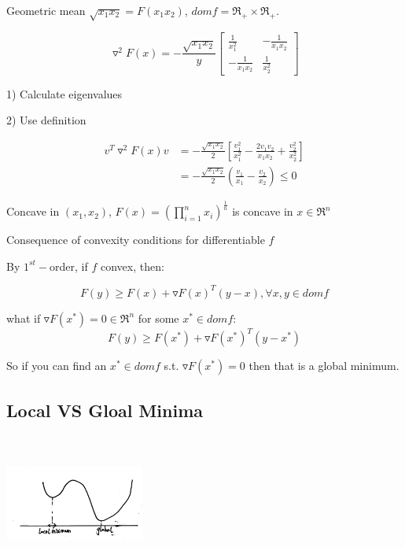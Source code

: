 \begin{example}
	Geometric mean $\sqrt{x_1x_2} = F(x_1x_2)$, $domf = \Re_+ \times \Re_+$.
	
	\begin{equation*}
	\triangledown^2F(x) = -\frac{\sqrt{x_1x_2}}{y}\begin{bmatrix}
	\frac{1}{x^2_1} & -\frac{1}{x_1x_2}\\
	-\frac{1}{x_1x_2} & \frac{1}{x^2_2}
	\end{bmatrix}
	\end{equation*}
	
	1) Calculate eigenvalues
	
	2) Use definition
	
	\begin{align*}
	v^T\triangledown^2F(x)v &= -\frac{\sqrt{x_1x_2}}{2}[\frac{v_1^2}{x_1^2} - \frac{2v_1v_2}{x_1x_2} + \frac{v_2^2}{x^2_2}]\\
	&= -\frac{\sqrt{x_1x_2}}{2}(\frac{v_1}{x_1} -\frac{v_2}{x_2}) \leq 0
	\end{align*}
	
	Concave in $(x_1, x_2)$, $F(x) = (\prod^n_{i=1}x_i)^{\frac{1}{n}}$ is concave in $x\in \Re^n$
\end{example}

Consequence of convexity conditions for differentiable $f$

By $1^{st}-$order, if $f$ convex, then:

\begin{equation*}
F(y)\geq F(x) + \triangledown F(x)^T(y-x), \forall x,y\in domf
\end{equation*}


what if $\triangledown F(x^*) = 0 \in \Re^n$ for some $x^*\in domf$:
\begin{equation*}
F(y)\geq F(x^*) + \triangledown F(x^*)^T(y-x^*)
\end{equation*}

So if you can find an $x^*\in domf$ s.t. $\triangledown F(x^*) = 0$ then that is a global minimum.





\subsection{Local VS Gloal Minima}

\begin{marginfigure}
	\centering
	\includegraphics[width=1.8in,height=1.8in]{figures/ch08/figure1111_1.png}
\end{marginfigure}

